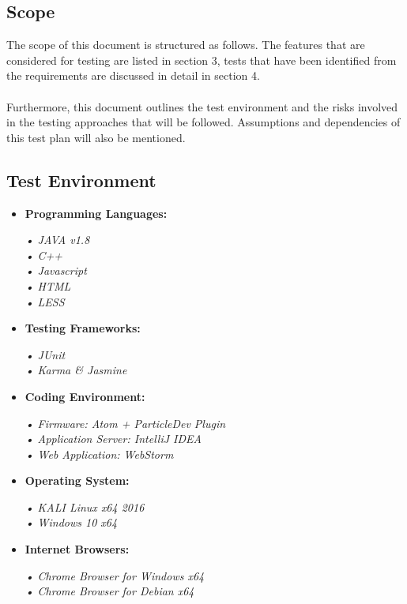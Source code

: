 \documentclass[a4paper,10pt]{article}
\begin{document}
		\subsection{Scope}
		The scope of this document is structured as 
		follows. The features that are considered for
		testing are listed in section 3, tests that have 
		been identified from the requirements are
		discussed in detail in section 4.\\\\Furthermore, 
		this document outlines the test environment
		and the risks involved in the testing approaches 
		that will be followed. Assumptions and
		dependencies of this test plan will also be 
		mentioned.
		
		\subsection{Test Environment}
		\begin{itemize}
			\item \textbf{Programming Languages:}
				\begin{flushleft}
					\textit{
					• JAVA v1.8\\
					• C++\\
					• Javascript\\
					• HTML\\
					• LESS\\}
				\end{flushleft}
				
			\item\textbf{Testing Frameworks:}
				\begin{flushleft}
					\textit{• JUnit\\
					• Karma \& Jasmine\\
						}
				\end{flushleft}
				
			\item\textbf{Coding Environment:}
			\begin{flushleft}
				\textit{• Firmware: Atom + ParticleDev Plugin\\
					• Application Server: IntelliJ IDEA\\
					• Web Application: WebStorm\\}
			\end{flushleft}
			
			\item\textbf{Operating System:}
			\begin{flushleft}
				\textit{• KALI Linux x64 2016\\
					• Windows 10 x64}
			\end{flushleft}
			\item\textbf{Internet Browsers:}
			\begin{flushleft}
				\textit{• Chrome Browser for Windows x64\\
					• Chrome Browser for Debian x64}
			\end{flushleft}
		\end{itemize}
		
\end{document}
